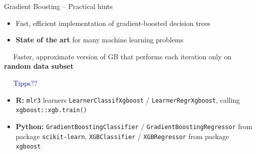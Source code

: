 \begin{frame}{Gradient Boosting -- Practical hints}

\footnotesize


\begin{itemize}
  \item Fast, efficient implementation of gradient-boosted decision trees
  \item \textbf{State of the art} for many machine learning problems
\end{itemize}

\medskip

 ~~ Faster, approximate version of 
GB that performs each iteration only on \textbf{random data subset} 

\medskip

 ~~ \textcolor{blue}{Tipps??}

\medskip


\begin{itemize}
  \item \textbf{R:} \texttt{mlr3} learners \texttt{LearnerClassifXgboost} / 
  \texttt{LearnerRegrXgboost}, calling \texttt{xgboost::xgb.train()}
  \item \textbf{Python:} \texttt{GradientBoostingClassifier} / 
  \texttt{GradientBoostingRegressor} from package \texttt{scikit-learn}, 
  \texttt{XGBClassifier} / \texttt{XGBRegressor} from package \texttt{xgboost}
\end{itemize}

\end{frame}